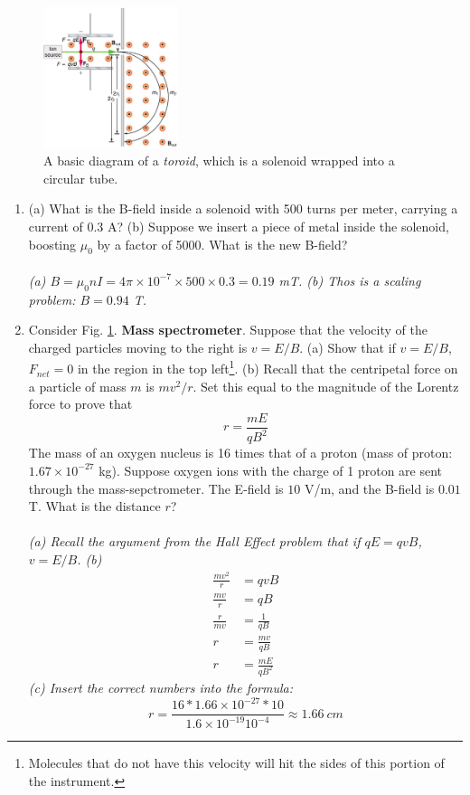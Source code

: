 \documentclass[10pt]{article}
\begin{document}
\begin{figure}[ht]
\centering
\includegraphics[width=0.35\textwidth]{vsel.jpeg}
\caption{\label{fig:chap12_1} A basic diagram of a \textit{toroid}, which is a solenoid wrapped into a circular tube.}
\end{figure}

\begin{enumerate}
\item (a) What is the B-field inside a solenoid with 500 turns per meter, carrying a current of 0.3 A? (b) Suppose we insert a piece of metal inside the solenoid, boosting $\mu_0$ by a factor of 5000.  What is the new B-field?  \\ \\
\textit{(a) $B = \mu_0 n I = 4\pi \times 10^{-7} \times 500 \times 0.3 = 0.19$ mT.  (b) Thos is a scaling problem: $B = 0.94$ T.}
\item Consider Fig. \ref{fig:chap12_1}.  \textbf{Mass spectrometer}.  Suppose that the 	velocity of the charged particles moving to the right is $v = E/B$.  (a) Show that if $v = E/B$, $F_{net} = 0$ in the region in the top left\footnote{Molecules that do not have this velocity will hit the sides of this portion of the instrument.}.  (b) Recall that the centripetal force on a particle of mass $m$ is $mv^2/r$.  Set this equal to the magnitude of the Lorentz force to prove that 
\begin{equation}
r = \frac{m E}{q B^2}
\end{equation}
The mass of an oxygen nucleus is 16 times that of a proton (mass of proton: $1.67 \times 10^{-27}$ kg).  Suppose oxygen ions with the charge of 1 proton are sent through the mass-sepctrometer.  The E-field is $10$ V/m, and the B-field is $0.01$ T.  What is the distance $r$?
\\ \\
\textit{(a) Recall the argument from the Hall Effect problem that if $qE = qvB$, $v = E/B$. (b) 
\begin{align}
\frac{mv^2}{r} &= qvB \\
\frac{mv}{r} &= qB \\
\frac{r}{mv} &= \frac{1}{qB} \\
r &= \frac{mv}{qB} \\
r &= \frac{mE}{qB^2}
\end{align}
(c) Insert the correct numbers into the formula:
\begin{equation}
r = \frac{16*1.66\times 10^{-27}*10}{1.6\times 10^{-19} 10^{-4}} \approx 1.66~cm
\end{equation}
}
\end{enumerate}
\end{document}
